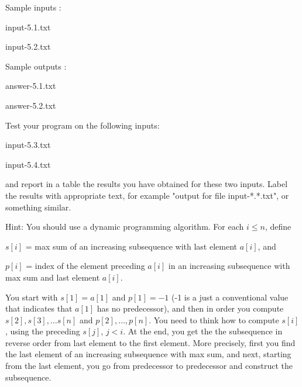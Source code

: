 \documentclass[11pt]{article}
\begin{document}
Sample inputs :
 
  input-5.1.txt

  input-5.2.txt



Sample outputs :
 
 answer-5.1.txt 

 answer-5.2.txt 

\medskip

Test your program on the following inputs:

   input-5.3.txt

input-5.4.txt

and report in a table the results you have obtained for these two inputs. Label the results with appropriate text, for example "output for file 
input-*.*.txt", or something similar.
\medskip


Hint:  You should use a dynamic programming algorithm.   For each $i \leq n$, define 

$s[i]$ = max sum of an increasing subsequence with last element $a[i]$, and

$p[i]$ = index of the element preceding $a[i]$ in  an increasing subsequence with max sum and last element $a[i]$.

  You start with $s[1]=a[1]$ and $p[1]=-1$ (-1 is a just a conventional value that indicates that $a[1]$ has no predecessor), and then in order you compute $s[2], s[3], \ldots s[n]$ and $p[2], \ldots, p[n]$. You need to think how to compute $s[i]$, using the preceding $s[j]$, $j < i$.  At the end,  you get the the subsequence in reverse order from last element to the first element. More precisely,  first you find the last element  of an  increasing subsequence with max sum, and next,  starting  from the last element, you go from predecessor to predecessor and construct the subsequence. 



\bigskip
\end{document}
